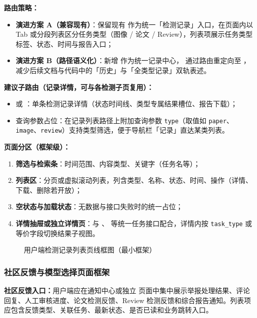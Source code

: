 \textbf{路由策略：}
\begin{itemize}[leftmargin=2em]
    \item \textbf{演进方案 A（兼容现有）}：保留现有  作为统一「检测记录」入口，在页面内以 Tab 或分段列表区分任务类型（图像 / 论文 / Review），列表项展示任务类型标签、状态、时间与报告入口；
    \item \textbf{演进方案 B（路径语义化）}：新增  作为统一记录中心， 通过路由重定向至 ，减少后续文档与代码中的「历史」与「全类型记录」双轨表述。
\end{itemize}

\textbf{建议子路由（记录详情，可与各检测子页复用）：}
\begin{itemize}[leftmargin=2em]
    \item {} 或 ：单条检测记录详情（状态时间线、类型专属结果槽位、报告下载）；
    \item 查询参数占位：在记录列表路径上附加查询参数 \texttt{type}（取值如 \texttt{paper}、\texttt{image}、\texttt{review}）支持类型筛选，便于导航栏「记录」直达某类列表。
\end{itemize}

\textbf{页面分区（框架级）：}
\begin{enumerate}[leftmargin=2em]
    \item \textbf{筛选与检索条}：时间范围、内容类型、关键字（任务名等）；
    \item \textbf{列表区}：分页或虚拟滚动列表，列含类型、名称、状态、时间、操作（详情、下载、删除若开放）；
    \item \textbf{空状态与加载状态}：无数据与接口失败时的统一占位；
    \item \textbf{详情抽屉或独立详情页}：与 、 等统一任务接口配合，详情内按 \texttt{task\_type} 或等价字段切换结果子视图。
\end{enumerate}

\begin{figure}[H]
    \centering
    \resizebox{0.98\textwidth}{!}{}
    \caption{用户端检测记录列表页线框图（最小框架）}
\end{figure}

\subsubsection{社区反馈与模型选择页面框架}
\textbf{社区反馈入口：}用户端应在通知中心或独立  页面中集中展示举报处理结果、评论回复、人工审核进度、论文检测反馈、Review 检测反馈和综合报告通知。列表项应包含反馈类型、关联任务、最新状态、是否已读和业务跳转入口。

